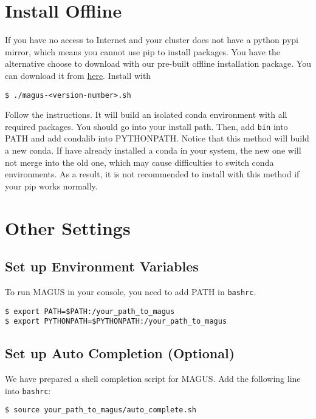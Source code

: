 \documentclass[12pt,oneside]{book}
\newcommand{\file}[1]{\texttt{#1}}
\newcommand{\chref}[3][blue]{\textcolor{#1}{\href{#2}{#3}}} %
\begin{document}
\section{Install Offline}
If you have no access to Internet and your cluster does not have a python pypi mirror, which means you cannot use pip to install packages. You have the alternative choose to download with our pre-built offline installation package. You can download it from \chref{https://gitlab.com/bigd4/magus/-/releases/}{here}. Install with 
\begin{tcolorbox}
    \begin{verbatim}
$ ./magus-<version-number>.sh
    \end{verbatim}
\end{tcolorbox}
Follow the instructions. It will build an isolated conda environment with all required packages. You should go into your install path. Then, add \file{bin} into PATH and add condalib into PYTHONPATH. Notice that this method will build a new conda. If have  already installed a conda in your system, the new one will not merge into the old one, which may cause difficulties to switch conda environments. As a result, it is not recommended to install with this method if your pip works normally.

\section{Other Settings}
\subsection{Set up Environment Variables}
To run MAGUS in your console, you need to add PATH in \file{bashrc}.
\begin{tcolorbox}
    \begin{verbatim}
$ export PATH=$PATH:/your_path_to_magus
$ export PYTHONPATH=$PYTHONPATH:/your_path_to_magus
    \end{verbatim}
\end{tcolorbox}


\subsection{Set up Auto Completion (Optional)}
We have prepared a shell completion script for MAGUS. Add the following line into \file{bashrc}:
\begin{tcolorbox}
    \begin{verbatim}
$ source your_path_to_magus/auto_complete.sh
    \end{verbatim}
\end{tcolorbox}
\end{document}

